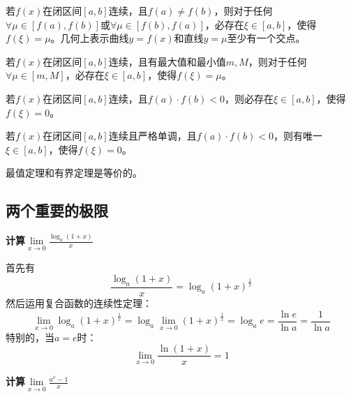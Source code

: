 \begin{theorem}[介值定理]
若$f\left( x \right) $在闭区间$\left[ a,b \right] $连续，且$f\left( a \right) \ne f\left( b \right) $，则对于任何$\forall \mu \in \left[ f\left( a \right) ,f\left( b \right) \right] $或$\forall \mu \in \left[ f\left( b \right) ,f\left( a \right) \right] $，必存在$\xi \in \left[ a,b \right] $，使得$f\left( \xi \right) =\mu $。几何上表示曲线$y=f\left( x \right) $和直线$y=\mu $至少有一个交点。
\end{theorem}

\begin{corollary}
若$f\left( x \right) $在闭区间$\left[ a,b \right] $连续，且有最大值和最小值$m,M$，则对于任何$\forall \mu \in \left[ m,M \right] $，必存在$\xi \in \left[ a,b \right] $，使得$f\left( \xi \right) =\mu $。
\end{corollary}

\begin{corollary}[根存在定理]
若$f\left( x \right) $在闭区间$\left[ a,b \right] $连续，且$f\left( a \right) \cdot f\left( b \right) <0$，则必存在$\xi \in \left[ a,b \right] $，使得$f\left( \xi \right) =0$。
\end{corollary}

\begin{corollary}[唯一根存在定理]
若$f\left( x \right) $在闭区间$\left[ a,b \right] $连续且严格单调，且$f\left( a \right) \cdot f\left( b \right) <0$，则有唯一$\xi \in \left[ a,b \right] $，使得$f\left( \xi \right) =0$。
\end{corollary}

最值定理和有界定理是等价的。

\subsection{两个重要的极限}

{\bf 计算$\underset{x\rightarrow 0}{\lim}\frac{\log _a\left( 1+x \right)}{x}$}

首先有
\[
\frac{\log _a\left( 1+x \right)}{x}=\log _a\left( 1+x \right) ^{\frac{1}{x}}
\]
然后运用复合函数的连续性定理：
\[
\underset{x\rightarrow 0}{\lim}\log _a\left( 1+x \right) ^{\frac{1}{x}}=\log _a\underset{x\rightarrow 0}{\lim}\left( 1+x \right) ^{\frac{1}{x}}=\log _ae=\frac{\ln e}{\ln a}=\frac{1}{\ln a}
\]
特别的，当$a=e$时：
\[
\underset{x\rightarrow 0}{\lim}\frac{\ln \left( 1+x \right)}{x}=1
\]

{\bf 计算$\underset{x\rightarrow 0}{\lim}\frac{a^x-1}{x}$}


